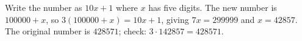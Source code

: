 Write the number as $10x+1$ where $x$ has five digits. The new number is $100000+x$, so $3(100000+x)=10x+1$, giving $7x=299999$ and $x=42857$. The original number is $\boxed{428571}$; check: $3\cdot142857=428571$.
